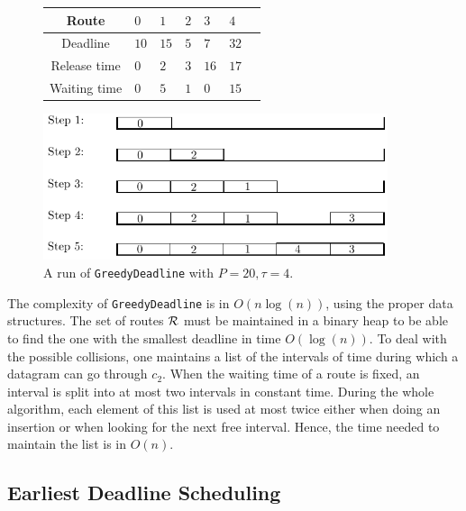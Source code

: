 \documentclass[a4paper,10pt]{journal}
\newcommand\greedydeadline{\texttt{GreedyDeadline}\xspace}
\begin{document}
    \begin{figure}
          \begin{center}
   \begin{tabularx}{0.9\textwidth}{|c|X|X|X|X|X|X|}
    \hline
     Route& $0$ & $1$ & $2$& $3$ & $4$\\
    \hline
    Deadline & $10$ &$15$&$5$&$7$&$32$\\
    \hline
     Release time & $0$ &$2$&$3$&$16$&$17$\\
    \hline
    Waiting time & $0$ &$5$&$1$&$0$&$15$\\
    \hline
      \end{tabularx}
      
      \vspace{1cm}
      \includegraphics[width=0.9\textwidth]{examplegreedy.pdf}
      \caption{A run of \greedydeadline with $P = 20, \tau = 4$.}
           \label{fig:greedydeadline}
      \end{center}
      
    \end{figure}

    The complexity of \greedydeadline is in $O(n\log(n))$, using the proper data structures. The set of routes $\cal{R}$ must be maintained in a binary heap to be able to find the one with the smallest deadline in time $O(\log(n))$. To deal with the possible collisions, one maintains a list of the intervals
    of time during which a datagram can go through $c_2$. When the waiting time of a route is fixed, an interval is split into at most two intervals in constant time. During the whole algorithm, each element of this list is used at most twice either when doing an insertion or when looking for the next free interval. Hence, the time needed to maintain the list is in $O(n)$. 
  
     \subsection{Earliest Deadline Scheduling}\label{sec:wtaheuristic}
     
\end{document}
